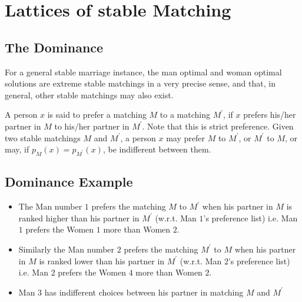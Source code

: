 \section{Lattices of stable Matching}

\subsection{The Dominance}
For a general stable marriage instance, the man optimal and woman optimal solutions are extreme stable matchings in a very precise sense, and that, in general, other stable matchings may also exist.\cite{gusfield_irving_1989} 

A person $x$ is said to prefer a matching $M$ to a matching $M^\prime$, if $x$ prefers his/her partner in $M$ to his/her partner in $M^\prime$. Note that this is strict preference. Given two stable matchings $M$ and $M^\prime$, a person $x$ may prefer $M$ to $M^\prime$, or $M^\prime$ to $M$, or may, if $p_M(x) = p_{M^\prime}(x)$, be indifferent between them.

\subsection{Dominance Example}

\begin{itemize}
    \item  The Man number $1$ prefers the matching $M$ to $M^\prime$ when his partner in $M$ is ranked higher than his partner in $M^\prime$ (w.r.t. Man $1$'s preference list) i.e. Man $1$ prefers the Women $1$ more than Women $2$.
    \item Similarly the Man number $2$ prefers the matching $M^\prime$ to $M$ when his partner in $M$ is ranked lower than his partner in $M^\prime$ (w.r.t. Man $2$'s preference list) i.e. Man $2$ prefers the Women $4$ more than Women $2$.
    \item Man $3$ has indifferent choices between his partner in matching $M$ and $M^\prime$
\end{itemize}
\pagebreak

